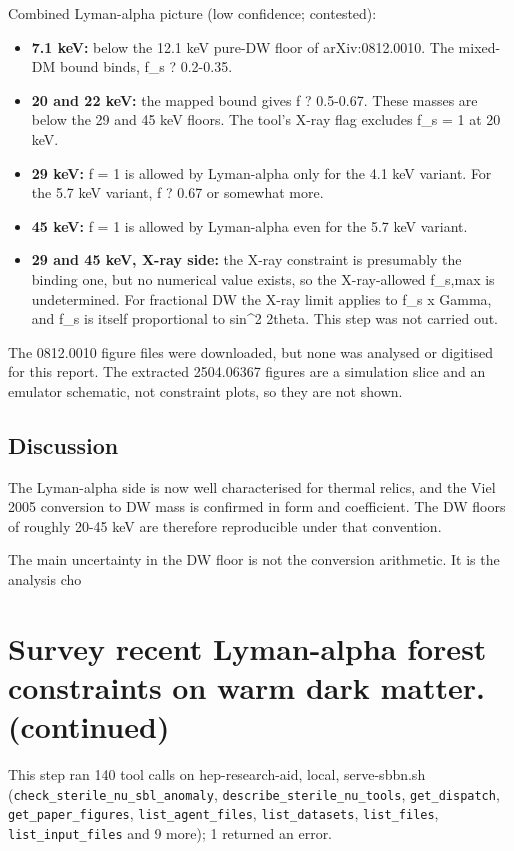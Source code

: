 \documentclass[11pt,a4paper]{article}
\begin{document}
Combined Lyman-alpha picture (low confidence; contested):

\begin{itemize}
  \item \textbf{7.1 keV:} below the 12.1 keV pure-DW floor of arXiv:0812.0010. The mixed-DM bound binds, f\_s ? 0.2-0.35.
  \item \textbf{20 and 22 keV:} the mapped bound gives f ? 0.5-0.67. These masses are below the 29 and 45 keV floors. The tool's X-ray flag excludes f\_s = 1 at 20 keV.
  \item \textbf{29 keV:} f = 1 is allowed by Lyman-alpha only for the 4.1 keV variant. For the 5.7 keV variant, f ? 0.67 or somewhat more.
  \item \textbf{45 keV:} f = 1 is allowed by Lyman-alpha even for the 5.7 keV variant.
  \item \textbf{29 and 45 keV, X-ray side:} the X-ray constraint is presumably the binding one, but no numerical value exists, so the X-ray-allowed f\_s,max is undetermined. For fractional DW the X-ray limit applies to f\_s x Gamma, and f\_s is itself proportional to sin\textasciicircum{}2 2theta. This step was not carried out.
\end{itemize}
The 0812.0010 figure files were downloaded, but none was analysed or digitised for this report. The extracted 2504.06367 figures are a simulation slice and an emulator schematic, not constraint plots, so they are not shown.

\subsection{Discussion}
The Lyman-alpha side is now well characterised for thermal relics, and the Viel 2005 conversion to DW mass is confirmed in form and coefficient. The DW floors of roughly 20-45 keV are therefore reproducible under that convention.

The main uncertainty in the DW floor is not the conversion arithmetic. It is the analysis cho


\section{Survey recent Lyman-alpha forest constraints on warm dark matter. (continued)}
This step ran 140 tool calls on hep-research-aid, local, serve-sbbn.sh (\texttt{check\_sterile\_nu\_sbl\_anomaly}, \texttt{describe\_sterile\_nu\_tools}, \texttt{get\_dispatch}, \texttt{get\_paper\_figures}, \texttt{list\_agent\_files}, \texttt{list\_datasets}, \texttt{list\_files}, \texttt{list\_input\_files} and 9 more); 1 returned an error.\par
\end{document}
